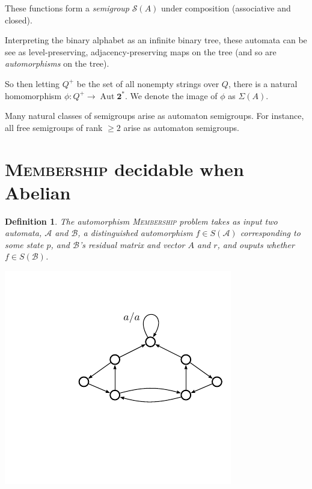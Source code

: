 \documentclass[a0]{a0poster}
\newcommand{\decprob}[1]{\textsc{#1}}
\newcommand{\A}{\mathcal{A}}
\newcommand{\B}{\mathcal{B}}
\theoremstyle{pleasant}
\newtheorem{definition}{Definition}
\newcommand{\0}{\underline{0}}
\newcommand{\1}{\underline{1}}
\newcommand{\2}{\underline{2}}
\renewcommand{\S}{\mathcal{S}}
\begin{document}
\begin{multicols}{3}
These functions form a \emph{semigroup} $\S(A)$ under composition
(associative and closed).

Interpreting the binary alphabet as an infinite binary tree, these
automata can be see as level-preserving, adjacency-preserving maps on
the tree (and so are \emph{automorphisms} on the tree).


So then letting $Q^+$ be the set of all nonempty strings over $Q$,
there is a natural homomorphism
$\phi : Q^+ \rightarrow \operatorname{Aut}\textbf{2}^*$. We denote the
image of $\phi$ as $\Sigma(A)$.


Many natural classes of semigroups arise as automaton semigroups. For
instance, all free semigroups of rank $\geq 2$ arise as automaton
semigroups.

\section*{\decprob{Membership} decidable when Abelian}

\begin{definition}
  The automorphism \decprob{Membership} problem takes as input two
  automata, $\A$ and $\B$, a distinguished automorphism $f \in S(\A)$
  corresponding to some state $p$, and $\B$'s residual matrix and
  vector $A$ and $r$, and ouputs whether $f \in S(\B)$.
\end{definition}

\vspace{1em}
\begin{center}
\includegraphics[scale=1.5]{../figures/bowtie}
\end{center}


\end{multicols}
\end{document}
